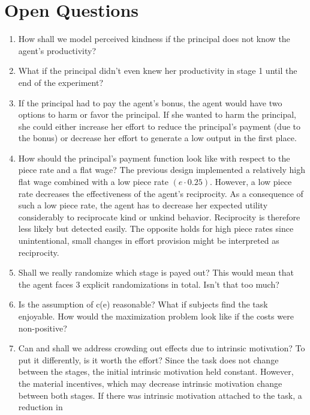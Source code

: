 \newpage\section{Open Questions}
\begin{enumerate}
      \item How shall we model perceived kindness if the principal does not know the agent's productivity?
      \item What if the principal didn't even knew her productivity in stage 1 until the end of the
      experiment?
      \item If the principal had to pay the agent's bonus, the agent would have two options to harm or favor
      the principal. If she wanted to harm the principal, she could either increase her effort to reduce the
      principal's payment (due to the bonus) or decrease her effort to generate a low output in the first
      place.
      \item How should the principal's payment function look like with respect to the piece rate and a flat
      wage? The previous design implemented a relatively high flat wage combined with a low piece rate
      \((e \cdot 0.25)\). However, a low piece rate decreases the effectiveness of the agent's reciprocity.
      As a consequence of such a low piece rate, the agent has to decrease her expected utility considerably
      to reciprocate kind or unkind behavior. Reciprocity is therefore less likely but detected easily. The
      opposite holds for high piece rates since unintentional, small changes in effort provision might be 
      interpreted as reciprocity.
      \item Shall we really randomize which stage is payed out? This would mean that the agent faces 3 
      explicit randomizations in total. Isn't that too much?
      \item Is the assumption of c(e) reasonable? What if subjects find the task enjoyable. How would the
      maximization problem look like if the costs were non-positive?
      \item Can and shall we address crowding out effects due to intrinsic motivation? To put it differently,
      is it worth the effort? Since the task does not change between the stages, the initial intrinsic 
      motivation held constant. However, the material incentives, which may decrease intrinsic motivation
      change between both stages. If there was intrinsic motivation attached to the task, a reduction in 

\end{enumerate}

